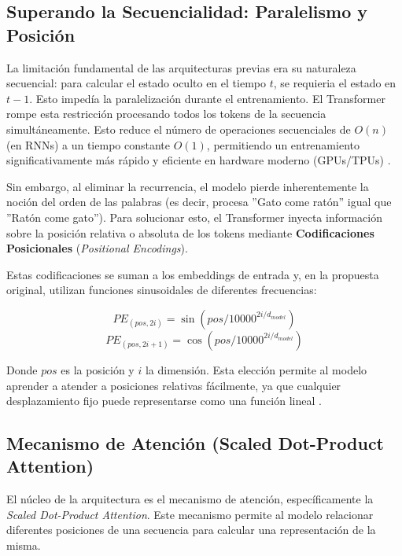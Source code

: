 \documentclass[11pt, a4paper]{article}
\begin{document}
\subsection{Superando la Secuencialidad: Paralelismo y Posición}

La limitación fundamental de las arquitecturas previas era su naturaleza secuencial: para calcular el estado oculto en el tiempo $t$, se requieria el estado en $t-1$. Esto impedía la 
paralelización durante el entrenamiento. El Transformer rompe esta restricción procesando todos los tokens de la secuencia simultáneamente. Esto reduce el número de operaciones secuenciales de
$O(n)$ (en RNNs) a un tiempo constante $O(1)$, permitiendo un entrenamiento significativamente más rápido y eficiente en hardware moderno (GPUs/TPUs) \cite{vaswani_attention_nodate}.

Sin embargo, al eliminar la recurrencia, el modelo pierde inherentemente la noción del orden de las palabras (es decir, procesa ''Gato come ratón'' igual que ''Ratón come gato''). Para solucionar
esto, el Transformer inyecta información sobre la posición relativa o absoluta de los tokens mediante \textbf{Codificaciones Posicionales} (\textit{Positional Encodings}).

Estas codificaciones se suman a los embeddings de entrada y, en la propuesta original, utilizan funciones sinusoidales de diferentes frecuencias:

\begin{equation}
    PE_{(pos, 2i)} = \sin(pos / 10000^{2i/d_{model}})
\end{equation}
\begin{equation}
    PE_{(pos, 2i+1)} = \cos(pos / 10000^{2i/d_{model}})
\end{equation}

Donde $pos$ es la posición y $i$ la dimensión. Esta elección permite al modelo aprender a atender a posiciones relativas fácilmente, ya que cualquier desplazamiento fijo puede representarse como
una función lineal \cite{vaswani_attention_nodate}.

\subsection{Mecanismo de Atención (Scaled Dot-Product Attention)}

El núcleo de la arquitectura es el mecanismo de atención, específicamente la \textit{Scaled Dot-Product Attention}. Este mecanismo permite al modelo relacionar diferentes posiciones de una 
secuencia para calcular una representación de la misma. 
\end{document}
